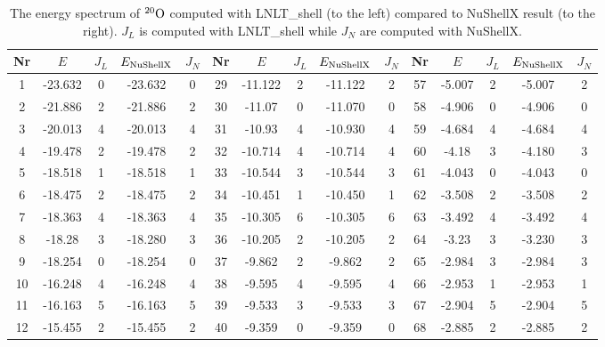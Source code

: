 \begin{table}[h]
\caption{The energy spectrum of $^{20}\rm{O}$ computed with LNLT\_shell (to the left) compared to NuShellX result (to the right). \(J_L\) is computed with LNLT\_shell while \(J_N\) are computed with NuShellX.}
\label{tab:ox20}
\begin{tabular}{|c|c|c|c|c||c|c|c|c|c||c|c|c|c|c|}
\hline Nr & \(E\) & \(J_{L}\) & \(E_{\rm{NuShellX}}\) & \(J_{N}\) & Nr & \(E\) & \(J_{L}\) & \(E_{\rm{NuShellX}}\) & \(J_{N}\) & Nr & \(E\) & \(J_{L}\) & \(E_{\rm{NuShellX}}\) & \(J_{N}\) \\
\hline 1   & -23.632 &       0 & -23.632 & 0 & 29  & -11.122 &       2 & -11.122 & 2 & 57  &  -5.007 &       2 & -5.007 & 2 \\
\hline 2   & -21.886 &       2 & -21.886 & 2 & 30  &  -11.07 &       0 & -11.070 & 0 & 58  &  -4.906 &       0 & -4.906 & 0 \\
\hline 3   & -20.013 &       4 & -20.013 & 4 & 31  &  -10.93 &       4 & -10.930 & 4 & 59  &  -4.684 &       4 & -4.684 & 4 \\
\hline 4   & -19.478 &       2 & -19.478 & 2 & 32  & -10.714 &       4 & -10.714 & 4 & 60  &   -4.18 &       3 & -4.180 & 3 \\
\hline 5   & -18.518 &       1 & -18.518 & 1 & 33  & -10.544 &       3 & -10.544 & 3 & 61  &  -4.043 &       0 & -4.043 & 0 \\
\hline 6   & -18.475 &       2 & -18.475 & 2 & 34  & -10.451 &       1 & -10.450 & 1 & 62  &  -3.508 &       2 & -3.508 & 2 \\
\hline 7   & -18.363 &       4 & -18.363 & 4 & 35  & -10.305 &       6 & -10.305 & 6 & 63  &  -3.492 &       4 & -3.492 & 4 \\
\hline 8   &  -18.28 &       3 & -18.280 & 3 & 36  & -10.205 &       2 & -10.205 & 2 & 64  &   -3.23 &       3 & -3.230 & 3 \\
\hline 9   & -18.254 &       0 & -18.254 & 0 & 37  &  -9.862 &       2 & -9.862 & 2 & 65  &  -2.984 &       3 & -2.984 & 3 \\
\hline 10  & -16.248 &       4 & -16.248 & 4 & 38  &  -9.595 &       4 & -9.595 & 4 & 66  &  -2.953 &       1 & -2.953 & 1 \\
\hline 11  & -16.163 &       5 & -16.163 & 5 & 39  &  -9.533 &       3 & -9.533 & 3 & 67  &  -2.904 &       5 & -2.904 & 5 \\
\hline 12  & -15.455 &       2 & -15.455 & 2 & 40  &  -9.359 &       0 & -9.359 & 0 & 68  &  -2.885 &       2 & -2.885 & 2 \\

\end{tabular}
\end{table}
